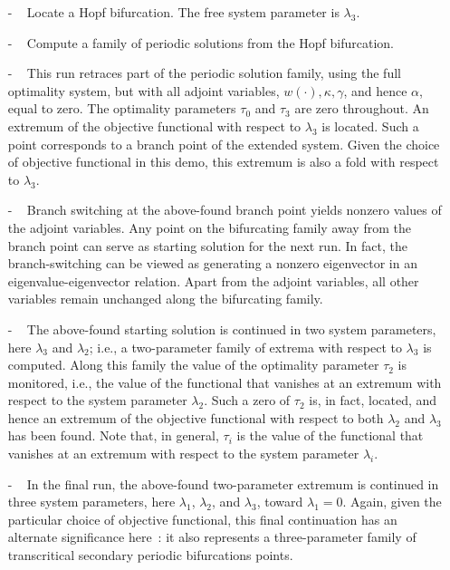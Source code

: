 \documentclass[12pt]{report}
\begin{document}
\begin{itemize}
\item[-] 
  ~ Locate a Hopf bifurcation. 
  The free system parameter is $\lambda_3$. 
\item[-]~ 
  Compute a family of periodic solutions from the Hopf bifurcation.
\item[-]~ 
  This run retraces part of the periodic solution family, 
  using the full optimality system,
  but with all adjoint variables, $w(\cdot), \kappa, \gamma$, 
  and hence $\alpha$, equal to zero.
  The optimality parameters $\tau_0$ and $\tau_3$ are zero throughout.
  An extremum of the objective functional with respect to $\lambda_3$
  is located.
  Such a point corresponds to a branch point of the extended system. 
  Given the choice of objective functional in this demo, 
  this extremum is also a fold with respect to $\lambda_3$.
\item[-]~
  Branch switching at the above-found branch point yields nonzero
  values of the adjoint variables.
  Any point on the bifurcating family away from the branch point
  can serve as starting solution for the next run.
  In fact, the branch-switching can be viewed as generating
  a nonzero eigenvector in an eigenvalue-eigenvector relation.
  Apart from the adjoint variables, all other variables remain
  unchanged along the bifurcating family.
\item[-]~ 
  The above-found starting solution is continued in two system parameters, 
  here $\lambda_3$ and $\lambda_2$; i.e., a two-parameter family 
  of extrema with respect to $\lambda_3$ is computed.
  Along this family the value of the optimality parameter $\tau_2$ 
  is monitored, i.e., the value of the functional that vanishes 
  at an extremum with respect to the system parameter $\lambda_2$.
  Such a zero of $\tau_2$ is, in fact, located, and hence an extremum 
  of the objective functional with respect to both $\lambda_2$ and 
  $\lambda_3$ has been found.
  Note that, in general, $\tau_i$ is the value of the
  functional that vanishes at an extremum with respect to the system
  parameter $\lambda_i$.
\item[-]~ 
  In the final run, the above-found two-parameter extremum is continued
  in three system parameters, here $\lambda_1$, $\lambda_2$, 
  and $\lambda_3$, toward $\lambda_1=0$.
  Again, given the particular choice of objective functional,
  this final continuation has an alternate significance here~:
  it also represents a three-parameter family of transcritical
  secondary periodic bifurcations points.
\end{itemize}
\end{document}
